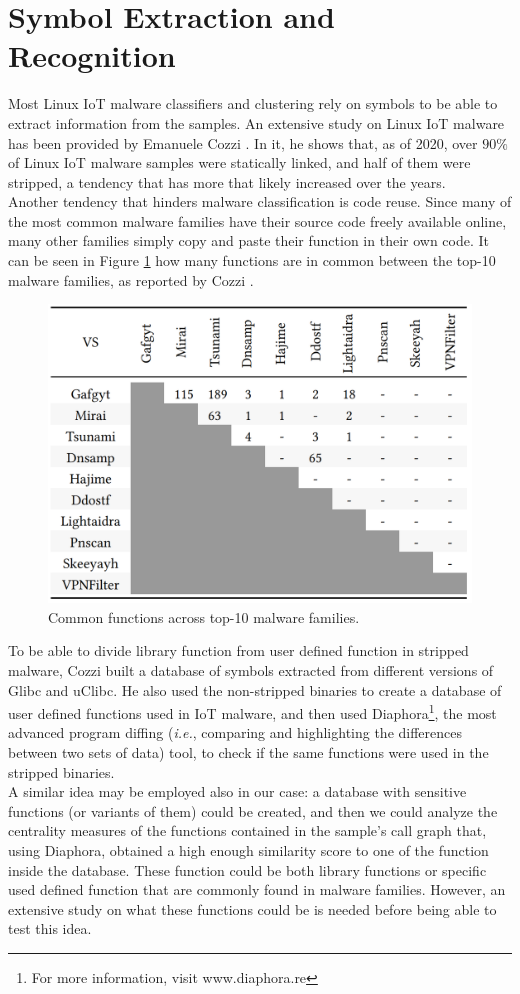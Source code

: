 \section{Symbol Extraction and Recognition}
Most Linux IoT malware classifiers and clustering rely on symbols to be able to extract information from the samples. An extensive study on Linux IoT malware has been provided by Emanuele Cozzi \cite{cozzi2020tangled}. In it, he shows that, as of 2020, over $90\%$ of Linux IoT malware samples were statically linked, and half of them were stripped, a tendency that has more that likely increased over the years. \\
Another tendency that hinders malware classification is code reuse. Since many of the most common malware families have their source code freely available online, many other families simply copy and paste their function in their own code. It can be seen in Figure \ref{fig:CodeReuse} how many functions are in common between the top-10 malware families, as reported by Cozzi \cite{cozzi2020tangled}.

\begin{figure}[H]
    \centering
    \includegraphics[width=0.7\linewidth]{Images/CodeReuse.png}
    \caption{Common functions across top-10 malware families.}
    \label{fig:CodeReuse}
\end{figure}

\noindent To be able to divide library function from user defined function in stripped malware, Cozzi built a database of symbols extracted from different versions of Glibc and uClibc. He also used the non-stripped binaries to create a database of user defined functions used in IoT malware, and then used Diaphora\footnote{For more information, visit www.diaphora.re}, the most advanced program diffing (\textit{i.e.}, comparing and highlighting the differences between two sets of data) tool, to check if the same functions were used in the stripped binaries. \\
A similar idea may be employed also in our case: a database with sensitive functions (or variants of them) could be created, and then we could analyze the centrality measures of the functions contained in the sample's call graph that, using Diaphora, obtained a high enough similarity score to one of the function inside the database. These function could be both library functions or specific used defined function that are commonly found in malware families. However, an extensive study on what these functions could be is needed before being able to test this idea.

